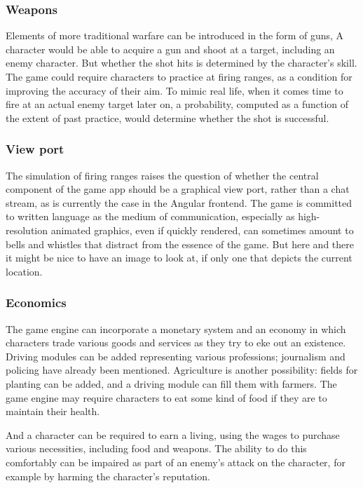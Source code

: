 \subsubsection{Weapons}

Elements of more traditional warfare can be introduced in the form of guns,
\etc\@
A character would be able to acquire a gun and shoot at a target, including
an enemy character.
But whether the shot hits is determined by the character's skill.
The game could require characters to practice at firing
ranges, as a condition for improving the accuracy of their aim.
To mimic real life, when it comes time to fire at an actual enemy target later
on, a probability, computed as a function of the extent of past practice, would
determine whether the shot is successful.

\subsubsection{View port}

The simulation of firing ranges raises the question of whether the central
component of the game app should be a graphical view port, rather than a
chat stream, as is currently the case in the Angular frontend.
The game is committed to written language as the medium of communication,
especially as high-resolution animated graphics, even if quickly
rendered, can sometimes amount to bells and whistles that distract from the
essence of the game.
But here and there it might be nice to have an image to look at, if only one
that depicts the current location.

\subsubsection{Economics}

The game engine can incorporate a monetary system and an economy in which
characters trade various goods and services as they try to eke out
an existence.
Driving modules can be added representing various professions;
journalism and policing have already been mentioned.
Agriculture is another possibility: fields for planting can be added,
and a driving module can fill them with farmers.
The game engine may require characters to eat some kind of food if they are
to maintain their health.

And a character can be required to earn a living, using the wages to
purchase various necessities, including food and weapons.
The ability to do this comfortably can be impaired as part of an enemy's attack
on the character, for example by harming the character's reputation.
